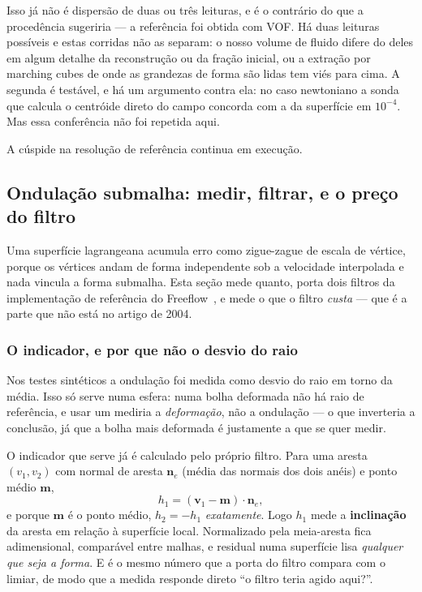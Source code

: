 Isso j\'a n\~ao \'e dispers\~ao de duas ou tr\^es leituras, e \'e o contr\'ario
do que a proced\^encia sugeriria --- a refer\^encia foi obtida com VOF. H\'a duas
leituras poss\'iveis e estas corridas n\~ao as separam: o nosso volume de fluido
difere do deles em algum detalhe da reconstru\c{c}\~ao ou da fra\c{c}\~ao
inicial, ou a extra\c{c}\~ao por marching cubes de onde as grandezas de forma
s\~ao lidas tem vi\'es para cima. A segunda \'e test\'avel, e h\'a um argumento
contra ela: no caso newtoniano a sonda que calcula o centr\'oide direto do campo
concorda com a da superf\'icie em $10^{-4}$. Mas essa confer\^encia n\~ao foi
repetida aqui.

A c\'uspide na resolu\c{c}\~ao de refer\^encia continua em execu\c{c}\~ao.

\subsection{Ondula\c{c}\~ao submalha: medir, filtrar, e o pre\c{c}o do filtro}
\label{sec:tsur}

Uma superf\'icie lagrangeana acumula erro como zigue-zague de escala de
v\'ertice, porque os v\'ertices andam de forma independente sob a velocidade
interpolada e nada vincula a forma submalha. Esta se\c{c}\~ao mede quanto, porta
dois filtros da implementa\c{c}\~ao de refer\^encia do
Freeflow~\cite{sousa2004}, e mede o que o filtro \emph{custa} --- que \'e a
parte que n\~ao est\'a no artigo de 2004.

\subsubsection{O indicador, e por que n\~ao o desvio do raio}

Nos testes sint\'eticos a ondula\c{c}\~ao foi medida como desvio do raio em
torno da m\'edia. Isso s\'o serve numa esfera: numa bolha deformada n\~ao h\'a
raio de refer\^encia, e usar um mediria a \emph{deforma\c{c}\~ao}, n\~ao a
ondula\c{c}\~ao --- o que inverteria a conclus\~ao, j\'a que a bolha mais
deformada \'e justamente a que se quer medir.

O indicador que serve j\'a \'e calculado pelo pr\'oprio filtro. Para uma aresta
$(v_1,v_2)$ com normal de aresta $\mathbf{n}_e$ (m\'edia das normais dos dois
an\'eis) e ponto m\'edio $\mathbf{m}$,
\[
  h_1 = (\mathbf{v}_1 - \mathbf{m})\cdot\mathbf{n}_e ,
\]
e porque $\mathbf{m}$ \'e o ponto m\'edio, $h_2 = -h_1$ \emph{exatamente}. Logo
$h_1$ mede a \textbf{inclina\c{c}\~ao} da aresta em rela\c{c}\~ao \`a
superf\'icie local. Normalizado pela meia-aresta fica adimensional, compar\'avel
entre malhas, e residual numa superf\'icie lisa \emph{qualquer que seja a
forma}. E \'e o mesmo n\'umero que a porta do filtro compara com o limiar, de
modo que a medida responde direto ``o filtro teria agido aqui?''.

